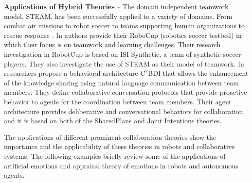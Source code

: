 \textbf{Applications of Hybrid Theories} -- The domain independent teamwork
model, STEAM, has been successfully applied to a variety of domains.  From
combat air missions \cite{hill:synthetic-battlefield-aircraft} to robot soccer
\cite{kitano:robocup} to teams supporting human organizations
\cite{pynadath:teamwork-heterogeneous-agents} to rescue response
\cite{scerri:robot-agent-person}. In \cite{marsella:robocup} authors provide
their RoboCup (robotics soccer testbed) in which their focus is on teamwork and
learning challenges. Their research investigation in RobotCup is based on ISI
Synthetic, a team of synthetic soccer-players. They also investigate the use of
STEAM as their model of teamwork. In \cite{kabil:coordination-mechanisms}
researchers propose a behavioral architecture C$^2$BDI that allows the
enhancement of the knowledge sharing using natural language communication
between team members. They define collaborative conversation protocols that
provide proactive behavior to agents for the coordination between team members.
Their agent architecture provides deliberative and conversational behaviors for
collaboration, and it is based on both of the SharedPlans and Joint Intentions
theories.

The applications of different prominent collaboration theories show the
importance and the applicability of these theories in robots and collaborative
systems. The following examples briefly review some of the applications of
artificial emotions and appraisal theory of emotions in robots and autonomous
agents.\\

